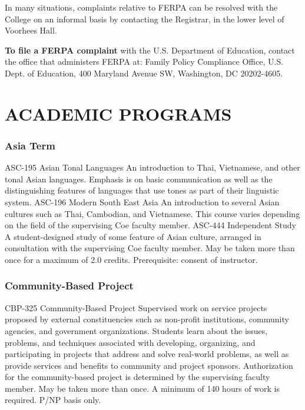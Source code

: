 \documentclass[
  letterpaper,
]{scrbook}
\renewcommand{\part}[1]{\addcontentsline{toc}{part}{#1}}
\begin{document}
In many situations, complaints relative to FERPA can be resolved with
the College on an informal basis by contacting the Registrar, in the
lower level of Voorhees Hall.

\textbf{To file a FERPA complaint} with the U.S. Department of
Education, contact the office that administers FERPA at: Family Policy
Compliance Office, U.S. Dept. of Education, 400 Maryland Avenue SW,
Washington, DC 20202-4605.

\part{COURSES OF INSTRUCTION}

\chapter{ACADEMIC PROGRAMS}\label{academic-programs}

\subsection{Asia Term}\label{asia-term-1}

ASC-195 Asian Tonal Languages An introduction to Thai, Vietnamese, and
other tonal Asian languages. Emphasis is on basic communication as well
as the distinguishing features of languages that use tones as part of
their linguistic system. ASC-196 Modern South East Asia An introduction
to several Asian cultures such as Thai, Cambodian, and Vietnamese. This
course varies depending on the field of the supervising Coe faculty
member. ASC-444 Independent Study A student-designed study of some
feature of Asian culture, arranged in consultation with the supervising
Coe faculty member. May be taken more than once for a maximum of 2.0
credits. Prerequisite: consent of instructor.

\subsection{Community-Based Project}\label{community-based-project}

CBP-325 Community-Based Project Supervised work on service projects
proposed by external constituencies such as non-profit institutions,
community agencies, and government organizations. Students learn about
the issues, problems, and techniques associated with developing,
organizing, and participating in projects that address and solve
real-world problems, as well as provide services and benefits to
community and project sponsors. Authorization for the community-based
project is determined by the supervising faculty member. May be taken
more than once. A minimum of 140 hours of work is required. P/NP basis
only.
\end{document}
